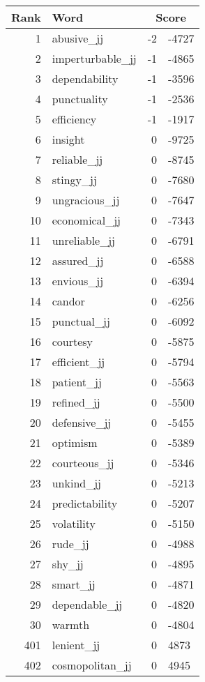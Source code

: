 \begin{longtable}[!htbp]{| rlr@{.}l |}
    \hline
    \textbf{Rank} & \textbf{Word} & \multicolumn{2}{c|}{\textbf{Score}} \\
    \hline
    \endhead
    1 & abusive\_jj & -2 & -4727 \\
    2 & imperturbable\_jj & -1 & -4865 \\
    3 & dependability & -1 & -3596 \\
    4 & punctuality & -1 & -2536 \\
    5 & efficiency & -1 & -1917 \\
    6 & insight & 0 & -9725 \\
    7 & reliable\_jj & 0 & -8745 \\
    8 & stingy\_jj & 0 & -7680 \\
    9 & ungracious\_jj & 0 & -7647 \\
    10 & economical\_jj & 0 & -7343 \\
    11 & unreliable\_jj & 0 & -6791 \\
    12 & assured\_jj & 0 & -6588 \\
    13 & envious\_jj & 0 & -6394 \\
    14 & candor & 0 & -6256 \\
    15 & punctual\_jj & 0 & -6092 \\
    16 & courtesy & 0 & -5875 \\
    17 & efficient\_jj & 0 & -5794 \\
    18 & patient\_jj & 0 & -5563 \\
    19 & refined\_jj & 0 & -5500 \\
    20 & defensive\_jj & 0 & -5455 \\
    21 & optimism & 0 & -5389 \\
    22 & courteous\_jj & 0 & -5346 \\
    23 & unkind\_jj & 0 & -5213 \\
    24 & predictability & 0 & -5207 \\
    25 & volatility & 0 & -5150 \\
    26 & rude\_jj & 0 & -4988 \\
    27 & shy\_jj & 0 & -4895 \\
    28 & smart\_jj & 0 & -4871 \\
    29 & dependable\_jj & 0 & -4820 \\
    30 & warmth & 0 & -4804 \\
    401 & lenient\_jj & 0 & 4873 \\
    402 & cosmopolitan\_jj & 0 & 4945 \\

\end{longtable}
